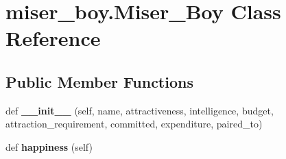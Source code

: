 \hypertarget{classmiser__boy_1_1_miser___boy}{}\section{miser\+\_\+boy.\+Miser\+\_\+\+Boy Class Reference}
\label{classmiser__boy_1_1_miser___boy}
\subsection*{Public Member Functions}
\begin{DoxyCompactItemize}
\item 
\mbox{\label{classmiser__boy_1_1_miser___boy_a5d920fd6f24fcf5c7308e4f8e785c174}} 
def {\bfseries \+\_\+\+\_\+init\+\_\+\+\_\+} (self, name, attractiveness, intelligence, budget, attraction\+\_\+requirement, committed, expenditure, paired\+\_\+to)
\item 
\mbox{\label{classmiser__boy_1_1_miser___boy_a60d4e133633b070b0fa4ccf418c1d77b}} 
def {\bfseries happiness} (self)
\end{DoxyCompactItemize}
